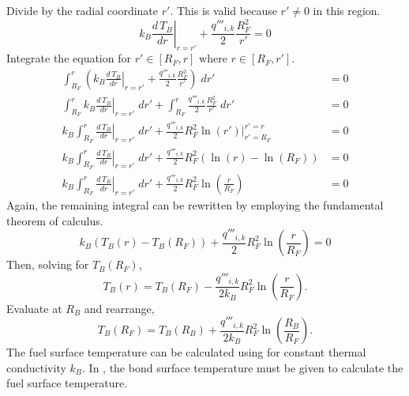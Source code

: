       Divide  by the radial coordinate $r'$. This is
      valid because $r' \ne 0$ in this region.
      \begin{equation}
        \left. k_B \frac{d\,T_B}{dr} \right|_{r=r'} + 
          \frac{q'''_{i,k}}{2} \frac{R_F^2}{r'} = 0
      \end{equation}
      Integrate the equation for $r' \in [R_F,r]$ where $r \in [R_F,r']$.
      \begin{align}
        \int_{R_F}^r \left( \left. k_B \frac{d\,T_B}{dr}\right|_{r=r'}
          + \frac{q'''_{i,k}}{2} \frac{R_F^2}{r'} \right) \; dr' &= 0 \\
        \int_{R_F}^r \left. k_B \frac{d\,T_B}{dr}\right|_{r=r'} \; dr'
          + \int_{R_F}^r \frac{q'''_{i,k}}{2} \frac{R_F^2}{r'} \; dr' &= 0\\
        k_B \int_{R_F}^r \left. \frac{d\,T_B}{dr}\right|_{r=r'} \; dr'
          + \frac{q'''_{i,k}}{2} R_F^2 \left. \ln(r') \right|_{r'=R_F}^{r'=r} &= 0\\
        k_B \int_{R_F}^r \left. \frac{d\,T_B}{dr}\right|_{r=r'} \; dr'
          + \frac{q'''_{i,k}}{2} R_F^2 ( \ln(r) - \ln(R_F)) &= 0 \\
        k_B \int_{R_F}^r \left. \frac{d\,T_B}{dr}\right|_{r=r'} \; dr'
          + \frac{q'''_{i,k}}{2} R_F^2 \ln\left(\frac{r}{R_F}\right) &= 0 
      \end{align}
      Again, the remaining integral can be rewritten by employing the
      fundamental theorem of calculus.
      \begin{equation}
        \label{eq:tf_fundamental_theorem}
        k_B (T_B(r) - T_B(R_F)) + \frac{q'''_{i,k}}{2} R_F^2 
          \ln\left(\frac{r}{R_F}\right) = 0
      \end{equation}
      Then, solving for $T_B(R_F)$,
      \begin{equation}
        \label{eq:tbr}
        T_B(r) = T_B(R_F) - \frac{q'''_{i,k}}{2 k_B} R_F^2 
          \ln\left(\frac{r}{R_F}\right).
      \end{equation}
      Evaluate at $R_B$ and rearrange,
      \begin{equation}
        \label{eq:tf_forward}
        T_B(R_F) = T_B(R_B) + \frac{q'''_{i,k}}{2 k_B} R_F^2 
          \ln\left(\frac{R_B}{R_F}\right).
      \end{equation}
      The fuel surface temperature can be calculated using
       for constant thermal conductivity $k_B$.
      In , the bond surface temperature must be
      given to calculate the fuel surface temperature.

